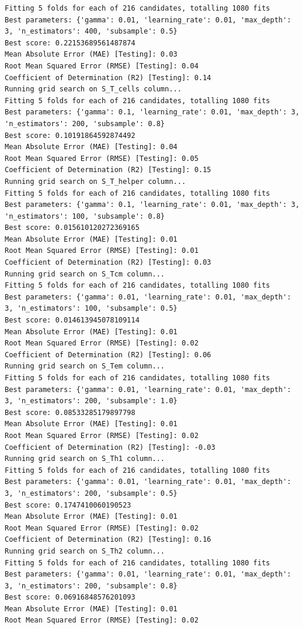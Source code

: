 \documentclass[
  letterpaper,
  DIV=11,
  numbers=noendperiod]{scrartcl}
\begin{document}
\begin{verbatim}
Fitting 5 folds for each of 216 candidates, totalling 1080 fits
Best parameters: {'gamma': 0.01, 'learning_rate': 0.01, 'max_depth': 3, 'n_estimators': 400, 'subsample': 0.5}
Best score: 0.22153689561487874
Mean Absolute Error (MAE) [Testing]: 0.03
Root Mean Squared Error (RMSE) [Testing]: 0.04
Coefficient of Determination (R2) [Testing]: 0.14
Running grid search on S_T_cells column...
Fitting 5 folds for each of 216 candidates, totalling 1080 fits
Best parameters: {'gamma': 0.1, 'learning_rate': 0.01, 'max_depth': 3, 'n_estimators': 200, 'subsample': 0.8}
Best score: 0.10191864592874492
Mean Absolute Error (MAE) [Testing]: 0.04
Root Mean Squared Error (RMSE) [Testing]: 0.05
Coefficient of Determination (R2) [Testing]: 0.15
Running grid search on S_T_helper column...
Fitting 5 folds for each of 216 candidates, totalling 1080 fits
Best parameters: {'gamma': 0.1, 'learning_rate': 0.01, 'max_depth': 3, 'n_estimators': 100, 'subsample': 0.8}
Best score: 0.015610120272369165
Mean Absolute Error (MAE) [Testing]: 0.01
Root Mean Squared Error (RMSE) [Testing]: 0.01
Coefficient of Determination (R2) [Testing]: 0.03
Running grid search on S_Tcm column...
Fitting 5 folds for each of 216 candidates, totalling 1080 fits
Best parameters: {'gamma': 0.01, 'learning_rate': 0.01, 'max_depth': 3, 'n_estimators': 100, 'subsample': 0.5}
Best score: 0.014613945078109114
Mean Absolute Error (MAE) [Testing]: 0.01
Root Mean Squared Error (RMSE) [Testing]: 0.02
Coefficient of Determination (R2) [Testing]: 0.06
Running grid search on S_Tem column...
Fitting 5 folds for each of 216 candidates, totalling 1080 fits
Best parameters: {'gamma': 0.01, 'learning_rate': 0.01, 'max_depth': 3, 'n_estimators': 200, 'subsample': 1.0}
Best score: 0.08533285179897798
Mean Absolute Error (MAE) [Testing]: 0.01
Root Mean Squared Error (RMSE) [Testing]: 0.02
Coefficient of Determination (R2) [Testing]: -0.03
Running grid search on S_Th1 column...
Fitting 5 folds for each of 216 candidates, totalling 1080 fits
Best parameters: {'gamma': 0.01, 'learning_rate': 0.01, 'max_depth': 3, 'n_estimators': 200, 'subsample': 0.5}
Best score: 0.1747410060190523
Mean Absolute Error (MAE) [Testing]: 0.01
Root Mean Squared Error (RMSE) [Testing]: 0.02
Coefficient of Determination (R2) [Testing]: 0.16
Running grid search on S_Th2 column...
Fitting 5 folds for each of 216 candidates, totalling 1080 fits
Best parameters: {'gamma': 0.01, 'learning_rate': 0.01, 'max_depth': 3, 'n_estimators': 200, 'subsample': 0.8}
Best score: 0.06916848576201093
Mean Absolute Error (MAE) [Testing]: 0.01
Root Mean Squared Error (RMSE) [Testing]: 0.02

\end{verbatim}
\end{document}
